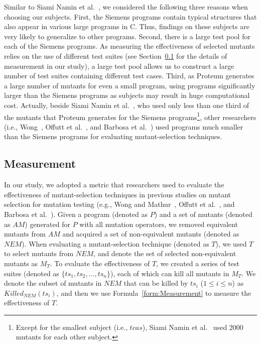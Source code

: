 Similar to Siami Namin et al.~\cite{SiamiNamin:08}, we considered
the following three reasons when choosing our subjects. First, the
Siemens programs contain typical structures that also appear in
various large programs in C. Thus, findings on these subjects are
very likely to generalize to other programs. Second, there is a
large test pool for each of the Siemens programs. As measuring the
effectiveness of selected mutants relies on the use of different
test suites (see Section~\ref{Measurement} for the details of
measurement in our study), a large test pool allows us to
construct a large number of test suites containing different test
cases. Third, as Proteum generates a large number of mutants for
even a small program, using programs significantly larger than the
Siemens programs as subjects may result in huge computational
cost. Actually, beside Siami Namin et al.~\cite{SiamiNamin:08},
who used only less than one third of the mutants that Proteum
generates for the Siemens programs\footnote{Except for the
smallest subject (i.e., $tcas$), Siami Namin et
al.~\cite{SiamiNamin:08} used 2000 mutants for each other
subject.}, other researchers (i.e., Wong~\cite{Wong:93}, Offutt et
al.~\cite{Offutt:96}, and Barbosa et al.~\cite{Barbosa:01}) used
programs much smaller than the Siemens programs for evaluating
mutant-selection techniques.


\vspace{-1ex}
\subsection{Measurement}
\label{Measurement}

In our study, we adopted a metric that researchers used to
evaluate the effectiveness of mutant-selection techniques in
previous studies on mutant selection for mutation testing (e.g.,
Wong and Mathur~\cite{Wong:93,Wong:95}, Offutt et
al.~\cite{Offutt:96}, and Barbosa et al.~\cite{Barbosa:01}). Given
a program (denoted as $P$) and a set of mutants (denoted as $AM$)
generated for $P$ with all mutation operators, we removed
equivalent mutants from $AM$ and acquired a set of non-equivalent
mutants (denoted as $NEM$). When evaluating a mutant-selection
technique (denoted as $T$), we used $T$ to select mutants from
$NEM$, and denote the set of selected non-equivalent mutants as
$M_T$. To evaluate the effectiveness of $T$, we created a series
of test suites (denoted as $\{ts_1, ts_2, ..., ts_n\}$), each of
which can kill all mutants in $M_T$. We denote the subset of
mutants in $NEM$ that can be killed by $ts_i$
($1\leq$$i$$\leq$$n$) as $Killed_{NEM}(ts_i)$, and then we use
Formula~\ref{form:Measurement} to measure the effectiveness of
$T$.\vspace{-2ex}

